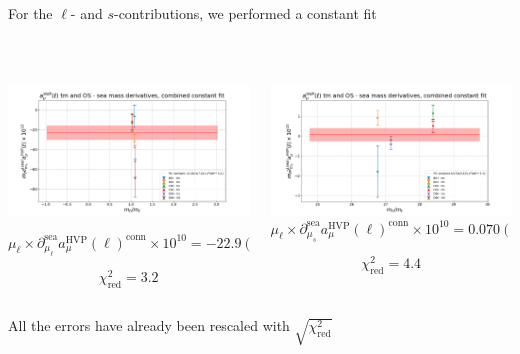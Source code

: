 \documentclass[xcolor={dvipsnames,table}]{beamer}
\begin{document}
\begin{frame}
\centering
    For the $\ell$- and $s$-contributions, we performed a constant fit
    
    \
    
    \begin{columns}
        \begin{column}{0.5\textwidth}
     \includegraphics[trim=0cm 0.3cm 0cm 1.2cm, clip,width=\textwidth]{plots/der_mq_sea_lore/fit_amu_der_ml_full.png}

        $$\mu_\ell\times\partial^\mathrm{sea}_{\mu_\ell}a^\mathrm{HVP}_\mu(\ell)^\mathrm{conn}\times10^{10} = -22.9(7.0)$$
        
        $$\chi^2_\mathrm{red}=3.2$$
        \end{column}
        \begin{column}{0.5\textwidth}
     \includegraphics[trim=0cm 0.3cm 0cm 1.2cm, clip,width=\textwidth]{plots/der_mq_sea_lore/fit_amu_der_ms_full.png}
        $$\mu_\ell\times\partial^\mathrm{sea}_{\mu_s}a^\mathrm{HVP}_\mu(\ell)^\mathrm{conn}\times10^{10} = 0.070(325)$$
        
        $$\chi^2_\mathrm{red}=4.4$$
        \end{column}
    \end{columns}
    All the errors have already been rescaled with $\sqrt{\chi^2_\mathrm{red}}$
\end{frame}
\end{document}
